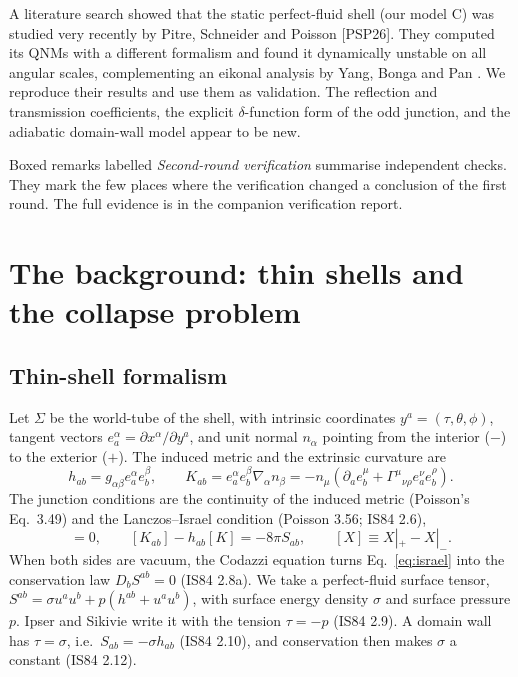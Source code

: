 \documentclass[11pt,a4paper]{article}
\numberwithin{equation}{section}
\begin{document}
A literature search showed that the static perfect-fluid shell (our model C) was studied very recently by Pitre,
Schneider and Poisson \cite{PSP26} [PSP26]. They computed its QNMs with a different formalism and found it
dynamically unstable on all angular scales, complementing an eikonal analysis by Yang, Bonga and Pan \cite{YBP23}.
We reproduce their results and use them as validation. The reflection and transmission coefficients, the explicit
$\delta$-function form of the odd junction, and the adiabatic domain-wall model appear to be new.

Boxed remarks labelled \emph{Second-round verification} summarise independent checks. They mark the few places
where the verification changed a conclusion of the first round. The full evidence is in the companion verification
report.

\section{The background: thin shells and the collapse problem}\label{sec:bg}
\subsection{Thin-shell formalism}
Let $\Sigma$ be the world-tube of the shell, with intrinsic coordinates $y^a=(\tau,\theta,\phi)$, tangent vectors
$e^\alpha_a=\partial x^\alpha/\partial y^a$, and unit normal $n_\alpha$ pointing from the interior ($-$) to the
exterior ($+$). The induced metric and the extrinsic curvature are \cite{Poisson04,IS84}
\begin{equation}
h_{ab}=g_{\alpha\beta}e^\alpha_ae^\beta_b,\qquad
K_{ab}=e^\alpha_ae^\beta_b\nabla_\alpha n_\beta=-n_\mu\left(\partial_ae^\mu_b+\Gamma^\mu{}_{\nu\rho}e^\nu_ae^\rho_b\right).
\label{eq:Kab}
\end{equation}
The junction conditions are the continuity of the induced metric (Poisson's Eq.~3.49) and the Lanczos--Israel
condition (Poisson 3.56; IS84 2.6),
\begin{equation}
[h_{ab}]=0,\qquad [K_{ab}]-h_{ab}[K]=-8\pi S_{ab},\qquad [X]\equiv X|_{+}-X|_{-} .
\label{eq:israel}
\end{equation}
When both sides are vacuum, the Codazzi equation turns Eq.~\eqref{eq:israel} into the conservation law
$D_bS^{ab}=0$ (IS84 2.8a). We take a perfect-fluid surface tensor,
$S^{ab}=\sigma u^au^b+p(h^{ab}+u^au^b)$, with surface energy density $\sigma$ and surface pressure $p$. Ipser and
Sikivie write it with the tension $\tau=-p$ (IS84 2.9). A domain wall has $\tau=\sigma$, i.e.\
$S_{ab}=-\sigma h_{ab}$ (IS84 2.10), and conservation then makes $\sigma$ a constant (IS84 2.12).
\end{document}
